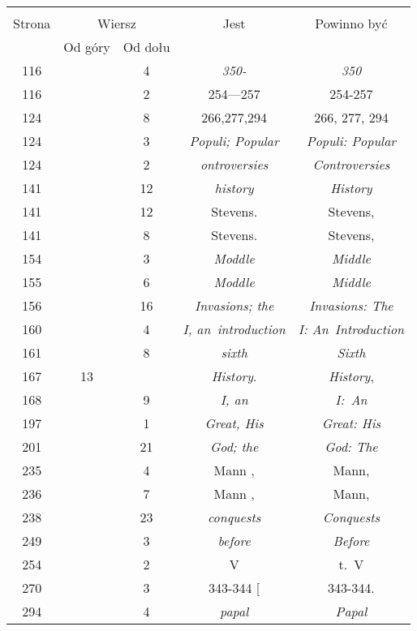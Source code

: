 \documentclass[a4paper,11pt]{article}
\begin{document}
\begin{center}
  \begin{tabular}{|c|c|c|c|c|}
    \hline
    & \multicolumn{2}{c|}{} & & \\
    Strona & \multicolumn{2}{c|}{Wiersz} & Jest
                              & Powinno być \\ \cline{2-3}
    & Od góry & Od dołu & & \\
    \hline
    116 & &  4 & \emph{350-} & \emph{350} \\
    116 & &  2 & 254---257 & 254-257 \\
    124 & &  8 & 266,277,294 & 266, 277, 294 \\
    124 & &  3 & \emph{Populi; Popular} & \emph{Populi: Popular} \\
    124 & &  2 & \emph{ontroversies} & \emph{Controversies} \\
    141 & & 12 & \emph{history} & \emph{History} \\
    141 & & 12 & Stevens. & Stevens, \\
    141 & &  8 & Stevens. & Stevens, \\
    154 & &  3 & \emph{Moddle} & \emph{Middle} \\
    155 & &  6 & \emph{Moddle} & \emph{Middle} \\
    156 & & 16 & \emph{Invasions; the} & \emph{Invasions: The} \\
    160 & &  4 & \emph{I, an~introduction} & \emph{I: An~Introduction} \\
    161 & &  8 & \emph{sixth} & \emph{Sixth} \\
    167 & 13 & & \emph{History}. & \emph{History}, \\
    168 & &  9 & \emph{I, an} & \emph{I:~An} \\
    197 & &  1 & \emph{Great, His} & \emph{Great: His} \\
    201 & & 21 & \emph{God; the} & \emph{God: The} \\
    235 & &  4 & Mann , & Mann, \\
    236 & &  7 & Mann , & Mann, \\
    238 & & 23 & \emph{conquests} & \emph{Conquests} \\
    249 & &  3 & \emph{before} & \emph{Before} \\
    254 & &  2 & V & t.~V \\
    270 & &  3 & 343-344 [ & 343-344. \\
    294 & &  4 & \emph{papal} & \emph{Papal} \\

\end{tabular}
\end{center}
\end{document}
